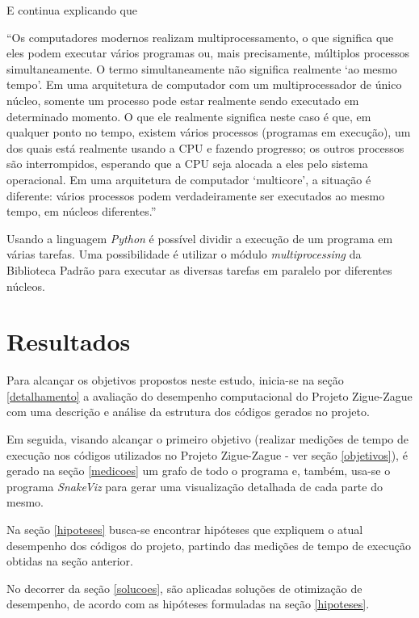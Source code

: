 \documentclass[12pt]{article}
\newcommand{\aspas}[1]{``#1''} %
\newcommand{\citacao}[1]{
	\singlespacing %
	\begin{flushright}
		\begin{minipage}{0.75\linewidth} %
			{\fontsize{10}{\baselineskip}\selectfont \aspas{#1}}
		\end{minipage}
	\end{flushright}
	\onehalfspacing %
}
\begin{document}
\noindent E continua explicando que 

\citacao{Os computadores modernos realizam multiprocessamento, o que significa que eles podem executar vários
	programas ou, mais precisamente, múltiplos processos simultaneamente. O termo simultaneamente não significa realmente `ao mesmo tempo'. Em uma arquitetura de computador com um multiprocessador de único núcleo, somente
	um processo pode estar realmente sendo executado em determinado momento. O que ele realmente significa neste
	caso é que, em qualquer ponto no tempo, existem vários processos (programas em execução), um dos quais está
	realmente usando a CPU e fazendo progresso; os outros processos são interrompidos, esperando que a CPU seja
	alocada a eles pelo sistema operacional. Em uma arquitetura de computador `multicore', a situação é diferente: vários
	processos podem verdadeiramente ser executados ao mesmo tempo, em núcleos diferentes.}

Usando a linguagem \textit{Python} é possível dividir a execução de um programa em várias tarefas. Uma possibilidade é utilizar o módulo \textit{multiprocessing} da Biblioteca Padrão para executar as diversas tarefas em paralelo por diferentes núcleos.


\section{Resultados}

Para alcançar os objetivos propostos neste estudo, inicia-se na seção \ref{detalhamento} a avaliação do desempenho computacional do Projeto Zigue-Zague com uma descrição e análise da estrutura dos códigos gerados no projeto.

Em seguida, visando alcançar o primeiro objetivo (realizar medições de tempo de execução nos códigos utilizados no Projeto Zigue-Zague - ver seção \ref{objetivos}), é gerado na seção \ref{medicoes} um grafo de todo o programa e, também, usa-se o programa \textit{SnakeViz} para gerar uma visualização detalhada de cada parte do mesmo.

Na seção \ref{hipoteses} busca-se encontrar hipóteses que expliquem o atual desempenho dos códigos do projeto, partindo das medições de tempo de execução obtidas na seção anterior.

No decorrer da seção \ref{solucoes}, são aplicadas soluções de otimização de desempenho, de acordo com as hipóteses formuladas na seção \ref{hipoteses}.
\end{document}
